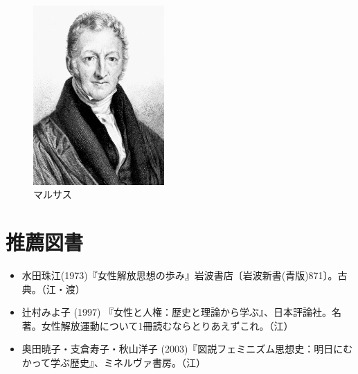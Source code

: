  \begin{figure}[htbp]
   \centering
     \includegraphics[width=50mm]{images/marthus.jpg}
   \caption{マルサス}
 \end{figure}



\section{推薦図書}





\begin{itemize}
\item 水田珠江(1973)『女性解放思想の歩み』岩波書店〔岩波新書(青版)871〕。古典。（江・渡）
\item 辻村みよ子 (1997) 『女性と人権：歴史と理論から学ぶ』、日本評論社。名著。女性解放運動について1冊読むならとりあえずこれ。（江）
\item 奥田暁子・支倉寿子・秋山洋子 (2003)『図説フェミニズム思想史：明日にむかって学ぶ歴史』、ミネルヴァ書房。（江）
\end{itemize}






